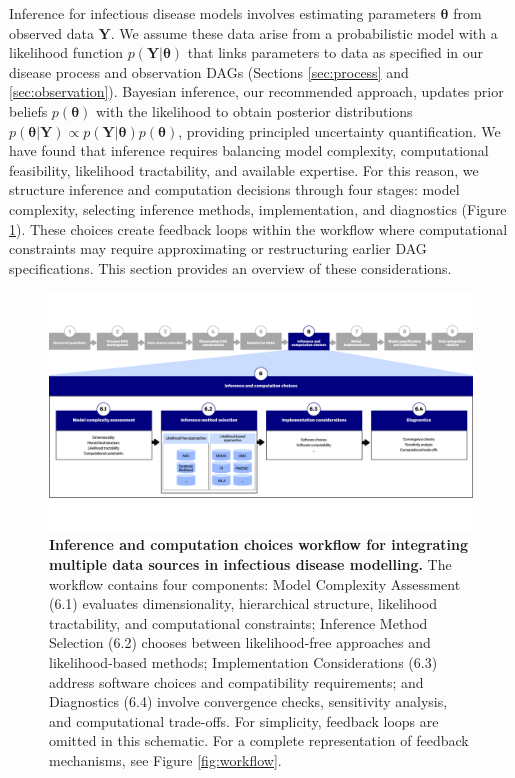 \documentclass{article}
\begin{document}
Inference for infectious disease models involves estimating parameters $\boldsymbol{\theta}$ from observed data $\boldsymbol{Y}$.
We assume these data arise from a probabilistic model with a likelihood function $p(\boldsymbol{Y} |
  \boldsymbol{\theta})$ that links parameters to data as specified in our disease process and observation \ac{DAG}s (Sections \ref{sec:process} and \ref{sec:observation}).
Bayesian inference, our recommended approach, updates prior beliefs $p(\boldsymbol{\theta})$ with the likelihood to obtain posterior distributions $p(\boldsymbol{\theta} | \boldsymbol{Y}) \propto p(\boldsymbol{Y}|\boldsymbol{\theta}) p(\boldsymbol{\theta})$, providing principled uncertainty quantification.
We have found that inference requires balancing model complexity, computational feasibility, likelihood tractability, and available expertise.
For this reason, we structure inference and computation decisions through four stages: model complexity, selecting inference methods, implementation, and diagnostics (Figure \ref{fig:fitting}). 
These choices create feedback loops within the workflow where computational constraints may require approximating or restructuring earlier \ac{DAG} specifications.
This section provides an overview of these considerations.

\begin{figure}[htbp]
    \centering
    \includegraphics[width=\textwidth]{figures/Abbott et al figure 3.png}
    \caption{\textbf{Inference and computation choices workflow for integrating multiple data sources in infectious disease modelling.} The workflow contains four components: Model Complexity Assessment (6.1) evaluates dimensionality, hierarchical structure, likelihood tractability, and computational constraints; Inference Method Selection (6.2) chooses between likelihood-free approaches and likelihood-based methods; Implementation Considerations (6.3) address software choices and compatibility requirements; and Diagnostics (6.4) involve convergence checks, sensitivity analysis, and computational trade-offs. For simplicity, feedback loops are omitted in this schematic. For a complete representation of feedback mechanisms, see Figure \ref{fig:workflow}.}
    \label{fig:fitting}
\end{figure}
\end{document}
